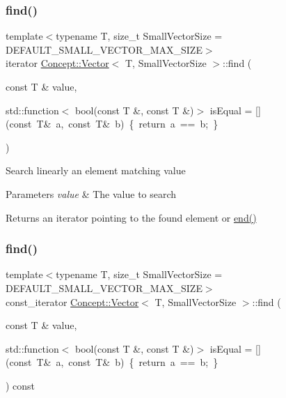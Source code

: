 \subsubsection{\texorpdfstring{find()}{find()}\hspace{0.1cm}{\footnotesize\ttfamily [1/2]}}
{\footnotesize\ttfamily template$<$typename T, size\+\_\+t Small\+Vector\+Size = D\+E\+F\+A\+U\+L\+T\+\_\+\+S\+M\+A\+L\+L\+\_\+\+V\+E\+C\+T\+O\+R\+\_\+\+M\+A\+X\+\_\+\+S\+I\+ZE$>$ \\
iterator \mbox{\hyperlink{class_concept_1_1_vector}{Concept\+::\+Vector}}$<$ T, Small\+Vector\+Size $>$\+::find (\begin{DoxyParamCaption}\item[{const T \&}]{value,  }\item[{std\+::function$<$ bool(const T \&, const T \&)$>$}]{is\+Equal = {\ttfamily \mbox{[}\mbox{]}(const~T\&~a,~const~T\&~b)~\{~return~a~==~b;~\}} }\end{DoxyParamCaption})\hspace{0.3cm}{\ttfamily [inline]}}

Search linearly an element matching value 
\begin{DoxyParams}{Parameters}
{\em value} & The value to search \\
\hline
\end{DoxyParams}
\begin{DoxyReturn}{Returns}
an iterator pointing to the found element or \mbox{\hyperlink{class_concept_1_1_vector_acf6f0b48aa0ecbd09e327d6b173d9ed8}{end()}} 
\end{DoxyReturn}
\mbox{\label{class_concept_1_1_vector_a8e87660ff45eb3b2112edd8397373d2a}} 
\subsubsection{\texorpdfstring{find()}{find()}\hspace{0.1cm}{\footnotesize\ttfamily [2/2]}}
{\footnotesize\ttfamily template$<$typename T, size\+\_\+t Small\+Vector\+Size = D\+E\+F\+A\+U\+L\+T\+\_\+\+S\+M\+A\+L\+L\+\_\+\+V\+E\+C\+T\+O\+R\+\_\+\+M\+A\+X\+\_\+\+S\+I\+ZE$>$ \\
const\+\_\+iterator \mbox{\hyperlink{class_concept_1_1_vector}{Concept\+::\+Vector}}$<$ T, Small\+Vector\+Size $>$\+::find (\begin{DoxyParamCaption}\item[{const T \&}]{value,  }\item[{std\+::function$<$ bool(const T \&, const T \&)$>$}]{is\+Equal = {\ttfamily \mbox{[}\mbox{]}(const~T\&~a,~const~T\&~b)~\{~return~a~==~b;~\}} }\end{DoxyParamCaption}) const\hspace{0.3cm}{\ttfamily [inline]}}

